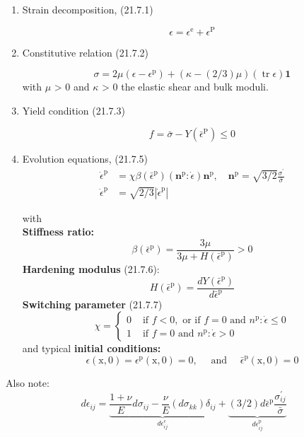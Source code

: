 \begin{enumerate}
\def\labelenumi{\arabic{enumi}.}
\item
  Strain decomposition, (21.7.1)

  \[
   \epsilon=\epsilon^{\mathrm{e}}+\epsilon^{\mathrm{P}}
   \]
\item
  Constitutive relation (21.7.2)

  \[\sigma=2 \mu\left(\epsilon-\epsilon^{\mathrm{p}}\right)+(\kappa-(2 / 3) \mu)(\operatorname{tr} \epsilon) \mathbf{1}\]
  with \(\mu\) \textgreater{} 0 and \(\kappa\) \textgreater{} 0 the
  elastic shear and bulk moduli.
\item
  Yield condition (21.7.3)

  \[
   f=\bar{\sigma}-Y\left(\bar{\epsilon}^{\mathrm{P}}\right) \leq 0
   \]
\item
  Evolution equations, (21.7.5) \[
   \begin{aligned} \dot{\epsilon}^{\mathrm{p}} &=\chi \beta\left(\bar{\epsilon}^{\mathrm{p}}\right)\left(\mathbf{n}^{\mathrm{p}}: \dot{\epsilon}\right) \mathbf{n}^{\mathrm{p}}, \quad \mathbf{n}^{\mathrm{p}}=\sqrt{3 / 2} \frac{\sigma^{\prime}}{\bar{\sigma}} \\ \dot{\epsilon}^{\mathrm{p}} &=\sqrt{2 / 3}\left|\dot{\epsilon}^{\mathrm{p}}\right| \end{aligned}
   \]

  with\\
  \textbf{Stiffness ratio:} \[
   \beta\left(\bar{\epsilon}^{\mathrm{p}}\right)=\frac{3 \mu}{3 \mu+H\left(\bar{\epsilon}^{\mathrm{p}}\right)}>0
   \] \textbf{Hardening modulus} (21.7.6): \[
   H\left(\bar{\epsilon}^{\mathrm{p}}\right)=\frac{d Y\left(\bar{\epsilon}^{\mathrm{p}}\right)}{d \bar{\epsilon}^{\mathrm{p}}}
   \] \textbf{Switching parameter} (21.7.7) \[
   \chi=\left\{\begin{array}{ll}{0} & {\text { if } f<0, \text { or if } f=0 \text { and } n^{\mathrm{p}}: \dot{\epsilon} \leq 0} \\ {1} & {\text { if } f=0 \text { and } n^{\mathrm{p}}: \dot{\epsilon}>0}\end{array}\right.
   \] and typical \textbf{initial conditions:} \[
   \epsilon(\mathrm{x}, 0)=\epsilon^{\mathrm{p}}(\mathrm{x}, 0)=0, \quad \text { and } \quad \bar{\epsilon}^{\mathrm{p}}(\mathrm{x}, 0)=0
   \]
\end{enumerate}

Also note: \[
d \epsilon_{i j}=\underbrace{\frac{1+\nu}{E} d \sigma_{i j}-\frac{\nu}{E}\left(d \sigma_{k k}\right) \delta_{i j}}_{d \epsilon_{i j}^{e}}+\underbrace{(3 / 2) d \bar{\epsilon}^{\mathrm{p}} \frac{\sigma_{i j}^{\prime}}{\bar{\sigma}}}_{d \epsilon_{i j}^{\mathrm{p}}}
\]

